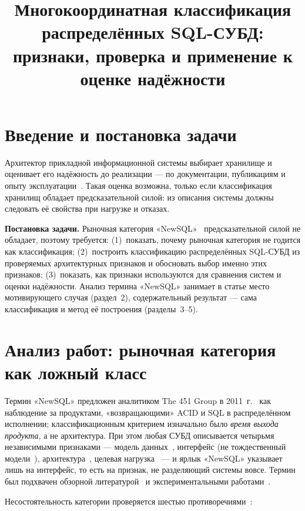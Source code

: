 \documentclass{misisarticle}
\title{Многокоординатная классификация распределённых SQL-СУБД: признаки, проверка и применение к оценке надёжности}
\begin{document}
\maketitle

\section{Введение и постановка задачи}

Архитектор прикладной информационной системы выбирает хранилище и оценивает его надёжность до реализации --- по документации, публикациям и опыту эксплуатации~\cite{levin,misissearch}. Такая оценка возможна, только если классификация хранилищ обладает предсказательной силой: из описания системы должны следовать её свойства при нагрузке и отказах.

\textbf{Постановка задачи.} Рыночная категория «NewSQL»~\cite{aslett} предсказательной силой не обладает, поэтому требуется: (1)~показать, почему рыночная категория не годится как классификация; (2)~построить классификацию распределённых SQL-СУБД из проверяемых архитектурных признаков и обосновать выбор именно этих признаков; (3)~показать, как признаки используются для сравнения систем и оценки надёжности. Анализ термина «NewSQL» занимает в статье место мотивирующего случая (раздел~2), содержательный результат --- сама классификация и метод её построения (разделы~3--5).

\section{Анализ работ: рыночная категория как ложный класс}

Термин «NewSQL» предложен аналитиком The 451 Group в 2011~г.~\cite{aslett} как наблюдение за продуктами, «возвращающими» ACID и SQL в распределённом исполнении; классификационным критерием изначально было \emph{время выхода продукта}, а не архитектура. При этом любая СУБД описывается четырьмя независимыми признаками --- модель данных~\cite{codd,elmasri}, интерфейс (не тождественный модели~\cite{date}), архитектура~\cite{ozsu}, целевая нагрузка~\cite{stonebraker2005} --- и ярлык «NewSQL» указывает лишь на интерфейс, то есть на признак, не разделяющий системы вовсе. Термин был подхвачен обзорной литературой~\cite{stonebraker2012,grolinger} и экспериментальными работами~\cite{oliveira}.

Несостоятельность категории проверяется шестью противоречиями~\cite{pavlo,dbengines,grolinger,oliveira,sobol}:
\end{document}
